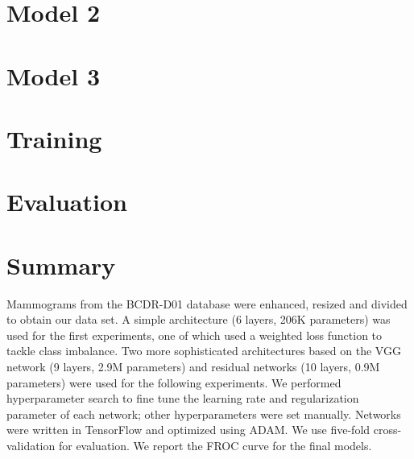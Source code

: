\section{Model 2}
\label{sec:Model 2}


\section{Model 3}
\label{sec:Model3}


\section{Training}


\section{Evaluation}


\section{Summary}
Mammograms from the BCDR-D01 database were enhanced, resized and divided to obtain our data set. A simple architecture (6 layers, 206K parameters) was used for the first experiments, one of which used a weighted loss function to tackle class imbalance. Two more sophisticated architectures based on the VGG network (9 layers, 2.9M parameters) and residual networks (10 layers, 0.9M parameters) were used for the following experiments. We performed hyperparameter search to fine tune the learning rate and regularization parameter of each network; other hyperparameters were set manually. Networks were written in TensorFlow and optimized using ADAM. We use five-fold cross-validation for evaluation. We report the FROC curve for the final models.
